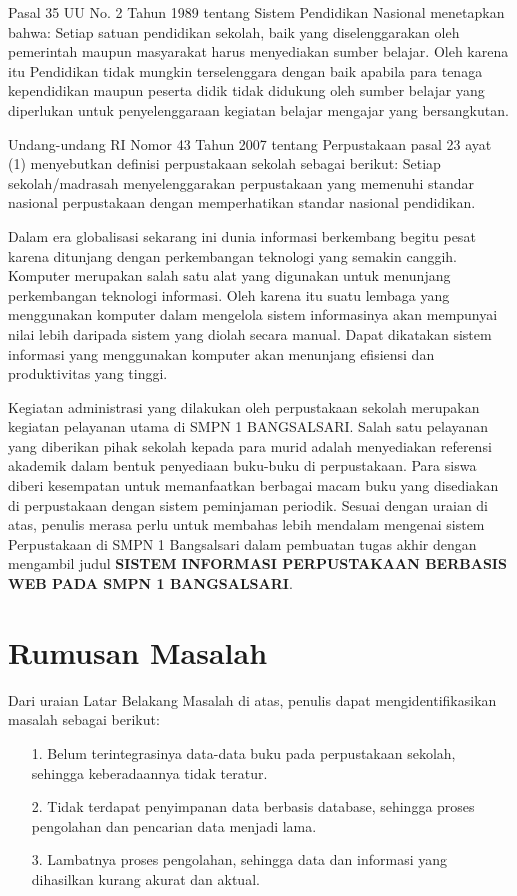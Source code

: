 \documentclass{jtetiproposalskripsi}
\begin{document}
Pasal 35 UU No. 2 Tahun 1989 tentang Sistem Pendidikan Nasional menetapkan bahwa: Setiap satuan pendidikan sekolah, baik yang diselenggarakan oleh pemerintah maupun masyarakat harus menyediakan sumber belajar. Oleh karena itu Pendidikan tidak mungkin terselenggara dengan baik apabila para tenaga kependidikan maupun peserta didik tidak didukung oleh sumber belajar yang diperlukan untuk penyelenggaraan kegiatan belajar mengajar yang bersangkutan.

Undang-undang RI Nomor 43 Tahun 2007 tentang Perpustakaan pasal 23 ayat (1) menyebutkan definisi perpustakaan sekolah sebagai berikut: Setiap sekolah/madrasah menyelenggarakan perpustakaan yang memenuhi standar nasional perpustakaan dengan memperhatikan standar nasional pendidikan.

Dalam era globalisasi sekarang ini dunia informasi berkembang begitu pesat karena ditunjang dengan perkembangan teknologi yang semakin canggih. Komputer merupakan salah satu alat yang digunakan untuk menunjang perkembangan teknologi informasi. Oleh karena itu suatu lembaga yang menggunakan komputer dalam mengelola sistem informasinya akan mempunyai nilai lebih daripada sistem yang diolah secara manual. Dapat dikatakan sistem informasi yang menggunakan komputer akan menunjang efisiensi dan produktivitas yang tinggi.

Kegiatan administrasi yang dilakukan oleh perpustakaan sekolah merupakan kegiatan pelayanan utama di SMPN 1 BANGSALSARI. Salah satu pelayanan yang diberikan pihak sekolah kepada para murid adalah menyediakan  referensi akademik dalam bentuk penyediaan buku-buku di perpustakaan. Para siswa diberi kesempatan untuk memanfaatkan berbagai macam buku yang disediakan di perpustakaan dengan sistem peminjaman periodik.
Sesuai dengan uraian di atas, penulis merasa perlu untuk membahas lebih mendalam mengenai sistem Perpustakaan di SMPN 1 Bangsalsari dalam pembuatan tugas akhir dengan mengambil judul \textbf{SISTEM INFORMASI PERPUSTAKAAN BERBASIS WEB PADA SMPN 1 BANGSALSARI}.

\section{Rumusan Masalah}
Dari uraian Latar Belakang Masalah di atas, penulis dapat mengidentifikasikan masalah sebagai berikut:
\begin{itemize}
\item[1.]Belum terintegrasinya data-data buku pada perpustakaan sekolah, sehingga keberadaannya tidak teratur.
\item[2.]Tidak terdapat penyimpanan data berbasis database, sehingga proses pengolahan dan pencarian data menjadi lama.
\item[3.]Lambatnya proses pengolahan, sehingga data dan informasi yang dihasilkan kurang akurat dan aktual.

\end{itemize}
\end{document}

